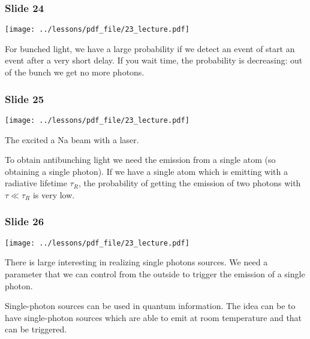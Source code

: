 \documentclass[../main/main.tex]{subfiles}
\begin{document}
\subsubsection*{Slide 24}

\begin{minipage}[]{0.5\linewidth}
\centering
\texttt{[image: ../lessons/pdf\_file/23\_lecture.pdf]}
\end{minipage}
\hspace{0.3cm}\vspace{0.3cm}
\begin{minipage}[c]{0.47\linewidth}

For bunched light, we have a large probability if we detect an event of start an event after a very short delay. If you wait time, the probability is decreasing: out of the bunch we get no more photons.

\end{minipage}

\subsubsection*{Slide 25}

\begin{minipage}[]{0.5\linewidth}
\centering
\texttt{[image: ../lessons/pdf\_file/23\_lecture.pdf]}
\end{minipage}
\hspace{0.3cm}\vspace{0.3cm}
\begin{minipage}[c]{0.47\linewidth}

The excited a Na beam with a laser.

To obtain antibunching light we need the emission from a single atom (so obtaining a single photon). If we have a single atom which is emitting with a radiative lifetime \( \tau _R \), the probability of getting the emission of two photons with \( \tau \ll \tau _R \) is very low.

\end{minipage}

\subsubsection*{Slide 26}

\begin{minipage}[]{0.5\linewidth}
\centering
\texttt{[image: ../lessons/pdf\_file/23\_lecture.pdf]}
\end{minipage}
\hspace{0.3cm}\vspace{0.3cm}
\begin{minipage}[c]{0.47\linewidth}

There is large interesting in realizing single photons sources. We need a parameter that we can control from the outside to trigger the emission of a single photon.

Single-photon sources can be used in quantum information. The idea can be to have single-photon sources which are able to emit at room temperature and that can be triggered.

\end{minipage}
\end{document}
